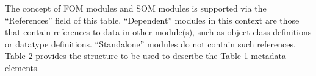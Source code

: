 The concept of FOM modules and SOM modules is supported via the ``References'' field of this table. ``Dependent'' modules in this context are those that contain references to data in other module(s), such as object class definitions or datatype definitions. ``Standalone'' modules do not contain such references. Table 2 provides the structure to be used to describe the Table 1 metadata elements.

\newpage
{}
\begingroup
\omttablesmallfont
\setlength{\tabcolsep}{4pt}
\renewcommand{\arraystretch}{1.35}
\noindent{}
